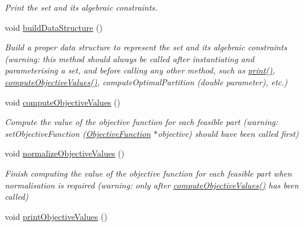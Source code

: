 \begin{DoxyCompactItemize}
\begin{DoxyCompactList}\small\item\em Print the set and its algebraic constraints. \end{DoxyCompactList}\item 
\hypertarget{classMultiSet_aba70d435622c677be1223d652b038697}{void \hyperlink{classMultiSet_aba70d435622c677be1223d652b038697}{build\-Data\-Structure} ()}\label{classMultiSet_aba70d435622c677be1223d652b038697}

\begin{DoxyCompactList}\small\item\em Build a proper data structure to represent the set and its algebraic constraints (warning\-: this method should always be called after instantiating and parameterising a set, and before calling any other method, such as \hyperlink{classMultiSet_ab08f0a90d249cecc0f7931caa2632f48}{print()}, \hyperlink{classMultiSet_a3818a284a0b82daef5daec126bbc402b}{compute\-Objective\-Values()}, compute\-Optimal\-Partition (double parameter), etc.) \end{DoxyCompactList}\item 
\hypertarget{classMultiSet_a3818a284a0b82daef5daec126bbc402b}{void \hyperlink{classMultiSet_a3818a284a0b82daef5daec126bbc402b}{compute\-Objective\-Values} ()}\label{classMultiSet_a3818a284a0b82daef5daec126bbc402b}

\begin{DoxyCompactList}\small\item\em Compute the value of the objective function for each feasible part (warning\-: set\-Objective\-Function (\hyperlink{classObjectiveFunction}{Objective\-Function} $\ast$objective) should have been called first) \end{DoxyCompactList}\item 
\hypertarget{classMultiSet_a67169c2a6ee3b807ddbda0a6a67372a9}{void \hyperlink{classMultiSet_a67169c2a6ee3b807ddbda0a6a67372a9}{normalize\-Objective\-Values} ()}\label{classMultiSet_a67169c2a6ee3b807ddbda0a6a67372a9}

\begin{DoxyCompactList}\small\item\em Finish computing the value of the objective function for each feasible part when normalisation is required (warning\-: only after \hyperlink{classMultiSet_a3818a284a0b82daef5daec126bbc402b}{compute\-Objective\-Values()} has been called) \end{DoxyCompactList}\item 
\hypertarget{classMultiSet_a3b42f5d74bd694d2da9c291027d9de22}{void \hyperlink{classMultiSet_a3b42f5d74bd694d2da9c291027d9de22}{print\-Objective\-Values} ()}\label{classMultiSet_a3b42f5d74bd694d2da9c291027d9de22}


\end{DoxyCompactItemize}
